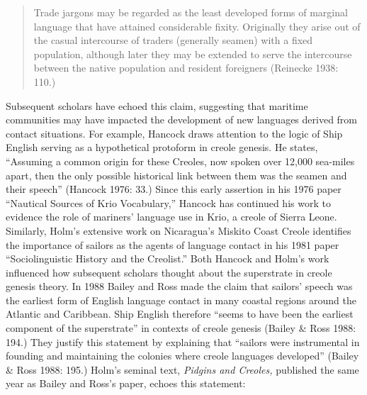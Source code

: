 \begin{quotation}
Trade jargons may be regarded as the least developed forms of marginal language that have attained considerable fixity. Originally they arise out of the casual intercourse of traders (generally seamen) with a fixed population, although later they may be extended to serve the intercourse between the native population and resident foreigners (Reinecke 1938: 110.) 

\end{quotation}
\begin{styleStandard}
Subsequent scholars have echoed this claim, suggesting that maritime communities may have impacted the development of new languages derived from contact situations. For example, Hancock draws attention to the logic of Ship English serving as a hypothetical protoform in creole genesis. He states, “Assuming a common origin for these Creoles, now spoken over 12,000 sea-miles apart, then the only possible historical link between them was the seamen and their speech” (Hancock 1976: 33.) Since this early assertion in his 1976 paper “Nautical Sources of Krio Vocabulary,” Hancock has continued his work to evidence the role of mariners’ language use in Krio, a creole of Sierra Leone. Similarly, Holm’s extensive work on Nicaragua’s Miskito Coast Creole identifies the importance of sailors as the agents of language contact in his 1981 paper “Sociolinguistic History and the Creolist.” Both Hancock and Holm’s work influenced how subsequent scholars thought about the superstrate in creole genesis theory. In 1988 Bailey and Ross made the claim that sailors’ speech\textbf{ }was the earliest form of English language contact in many coastal regions around the Atlantic and Caribbean. Ship English therefore “seems to have been the earliest component of the superstrate” in contexts of creole genesis (Bailey \& Ross 1988: 194.) They justify this statement by explaining that “sailors were instrumental in founding and maintaining the colonies where creole languages developed” (Bailey \& Ross 1988: 195.) Holm’s seminal text, \textit{Pidgins and Creoles, }published the same year as Bailey and Ross’s paper, echoes this statement: 
\end{styleStandard}


